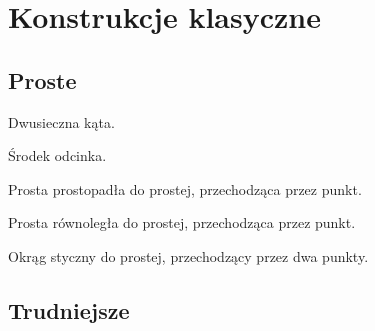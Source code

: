 %

\section{Konstrukcje klasyczne}


\subsection{Proste}
\begin{problem}
    Dwusieczna kąta.
\end{problem}

\begin{problem}
    Środek odcinka.
\end{problem}

\begin{problem}
    Prosta prostopadła do prostej, przechodząca przez punkt.
\end{problem}

\begin{problem}
    Prosta równoległa do prostej, przechodząca przez punkt.
\end{problem}

\begin{problem}
    Okrąg styczny do prostej, przechodzący przez dwa punkty.
\end{problem}



\subsection{Trudniejsze}


